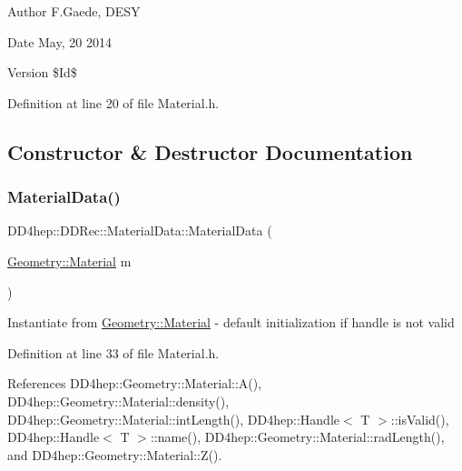 \begin{DoxyAuthor}{Author}
F.\+Gaede, D\+E\+SY 
\end{DoxyAuthor}
\begin{DoxyDate}{Date}
May, 20 2014 
\end{DoxyDate}
\begin{DoxyVersion}{Version}
\$\+Id\$ 
\end{DoxyVersion}


Definition at line 20 of file Material.\+h.



\subsection{Constructor \& Destructor Documentation}
\hypertarget{class_d_d4hep_1_1_d_d_rec_1_1_material_data_a13401e43c53f525dc9adc6b497c6f0e6}{}\label{class_d_d4hep_1_1_d_d_rec_1_1_material_data_a13401e43c53f525dc9adc6b497c6f0e6} 
\subsubsection{\texorpdfstring{Material\+Data()}{MaterialData()}\hspace{0.1cm}{\footnotesize\ttfamily [1/5]}}
{\footnotesize\ttfamily D\+D4hep\+::\+D\+D\+Rec\+::\+Material\+Data\+::\+Material\+Data (\begin{DoxyParamCaption}\item[{\hyperlink{class_d_d4hep_1_1_geometry_1_1_material}{Geometry\+::\+Material}}]{m }\end{DoxyParamCaption})\hspace{0.3cm}{\ttfamily [inline]}}

Instantiate from \hyperlink{class_d_d4hep_1_1_geometry_1_1_material}{Geometry\+::\+Material} -\/ default initialization if handle is not valid 

Definition at line 33 of file Material.\+h.



References D\+D4hep\+::\+Geometry\+::\+Material\+::\+A(), D\+D4hep\+::\+Geometry\+::\+Material\+::density(), D\+D4hep\+::\+Geometry\+::\+Material\+::int\+Length(), D\+D4hep\+::\+Handle$<$ T $>$\+::is\+Valid(), D\+D4hep\+::\+Handle$<$ T $>$\+::name(), D\+D4hep\+::\+Geometry\+::\+Material\+::rad\+Length(), and D\+D4hep\+::\+Geometry\+::\+Material\+::\+Z().

